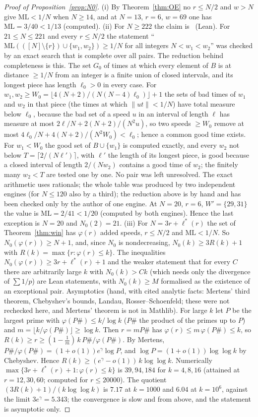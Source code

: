 \documentclass[11pt]{article}
\theoremstyle{definition}
\theoremstyle{remark}
\newcommand{\nd}[1]{\lVert #1\rVert}
\newcommand{\ML}{\mathrm{ML}}
\newcommand{\xC}[1]{\ref{B-#1}}
\begin{document}
\begin{proof}[Proof of Proposition~\ref{prop:N0}]
(i) By Theorem~\ref{thm:OE} no $r\le N/2$ and $w>N$ give $\ML<1/N$ when $N\ge14$, and at $N=13$, $r=6$, $w=69$ one has $\ML=3/40<1/13$ (computed). (ii) For $N\ge222$ the claim is~\cite[Theorem~\xC{thm:W}]{B} (Lean). For $21\le N\le221$ and every $r\le N/2$ the statement ``$\ML(([N]\setminus\{r\})\cup\{w_1,w_2\})\ge1/N$ for all integers $N<w_1<w_2$'' was checked by an exact search that is complete over all pairs. The reduction behind completeness is this. The set $G_0$ of times at which every element of $B$ is at distance $\ge1/N$ from an integer is a finite union of closed intervals, and its longest piece has length $\ell_0>0$ in every case. For $w_1,w_2\ge W_0=\lfloor4(N+2)/(N(N-4)\ell_0)\rfloor+1$ the sets of bad times of $w_1$ and $w_2$ in that piece (the times at which $\nd{ut}<1/N$) have total measure below $\ell_0$, because the bad set of a speed $u$ in an interval of length $\ell$ has measure at most $2\ell/N+2(N+2)/(N^2u)$, so two speeds $\ge W_0$ remove at most $4\ell_0/N+4(N+2)/(N^2W_0)<\ell_0$; hence a common good time exists. For $w_1<W_0$ the good set of $B\cup\{w_1\}$ is computed exactly, and every $w_2$ not below $T=\lceil2/(N\ell')\rceil$, with $\ell'$ the length of its longest piece, is good because a closed interval of length $2/(Nw_2)$ contains a good time of $w_2$; the finitely many $w_2<T$ are tested one by one. No pair was left unresolved. The exact arithmetic uses rationals; the whole table was produced by two independent engines (for $N\le120$ also by a third); the reduction above is by hand and has been checked only by the author of one engine. At $N=20$, $r=6$, $W'=\{29,31\}$ the value is $\ML=2/41<1/20$ (computed by both engines). Hence the last exception is $N=20$ and $N_0(2)=21$.
(iii) For $N=3r+\ell^*(r)$ the set of Theorem~\ref{thm:win} has $\varphi(r)$ added speeds, $r\le N/2$ and $\ML<1/N$. So $N_0(\varphi(r))\ge N+1$, and, since $N_0$ is nondecreasing, $N_0(k)\ge3R(k)+1$ with $R(k)=\max\{r:\varphi(r)\le k\}$. The inequalities $N_0(\varphi(r))\ge3r+\ell^*(r)+1$ and the weaker statement that for every $C$ there are arbitrarily large $k$ with $N_0(k)>Ck$ (which needs only the divergence of $\sum1/p$) are Lean statements, with $N_0(k)\ge M$ formalised as the existence of an exceptional pair. Asymptotics (hand, with cited analytic facts: Mertens' third theorem, Chebyshev's bounds, Landau, Rosser--Schoenfeld; these were not rechecked here, and Mertens' theorem is not in Mathlib). For large $k$ let $P$ be the largest prime with $\varphi(P\#)\le k/\log k$ ($P\#$ the product of the primes up to $P$) and $m=\lfloor k/\varphi(P\#)\rfloor\ge\log k$. Then $r=mP\#$ has $\varphi(r)\le m\,\varphi(P\#)\le k$, so $R(k)\ge r\ge(1-\frac1m)\,k\,P\#/\varphi(P\#)$. By Mertens, $P\#/\varphi(P\#)=(1+o(1))e^{\gamma}\log P$, and $\log P=(1+o(1))\log\log k$ by Chebyshev. Hence $R(k)\ge(e^{\gamma}-o(1))\,k\log\log k$. Numerically $\max\{3r+\ell^*(r)+1:\varphi(r)\le k\}$ is $39,94,184$ for $k=4,8,16$ (attained at $r=12,30,60$; computed for $r\le20000$). The quotient $(3R(k)+1)/(k\log\log k)$ is $7.17$ at $k=1000$ and $6.04$ at $k=10^6$, against the limit $3e^{\gamma}=5.343$; the convergence is slow and from above, and the statement is asymptotic only.
\end{proof}
\end{document}
